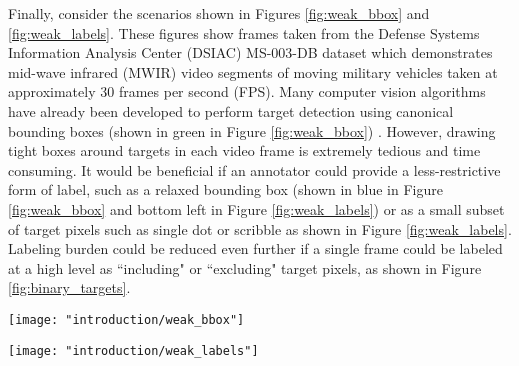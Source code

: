 Finally, consider the scenarios shown in Figures \ref{fig:weak_bbox} and \ref{fig:weak_labels}.  These figures show frames taken from the  Defense Systems Information Analysis Center (DSIAC) MS-003-DB dataset \citep{DSIACATR} which demonstrates mid-wave infrared (MWIR) video segments of moving military vehicles taken at approximately 30 frames per second (FPS).  Many computer vision algorithms have already been developed to perform target detection using canonical bounding boxes (shown in green in Figure \ref{fig:weak_bbox}) \citep{Redmon2018YOLOV3}.  However, drawing tight boxes around targets in each video frame is extremely tedious and time consuming.  It would be beneficial if an annotator could provide a less-restrictive form of label, such as a relaxed bounding box (shown in blue in Figure \ref{fig:weak_bbox} and bottom left in Figure \ref{fig:weak_labels}) or as a small subset of target pixels such as single dot or scribble as shown in Figure \ref{fig:weak_labels}.  Labeling burden could be reduced even further if a single frame could be labeled at a high level as ``including" or ``excluding" target pixels, as shown in Figure \ref{fig:binary_targets}. 


\begin{center}
	\begin{figure*}[h]
		\centering
		\texttt{[image: "introduction/weak\_bbox"]}
		\caption[Example of bounding box imprecision.]{A sample frame from the DSIAC  MS-003-DB MWIR dataset.  Two targets are shown with canonical bounding boxes (green) and relaxed bounding boxes (blue).  Red dots represent the centers of the target objects.}
		\label{fig:weak_bbox}
	\end{figure*}
\end{center}

\begin{center}
	\begin{figure*}[h]
		\centering
		\texttt{[image: "introduction/weak\_labels"]}
		\caption[Forms of weak labels.]{Examples of weakly-labeled infrared imagery.  The images demonstrate various forms of weak groundtruth around a pickup truck taken with a mid-wave infrared camera.  The images show spot, scribble, imprecise bounding box and image-level labels, respectively.}
		\label{fig:weak_labels}
	\end{figure*}
\end{center}



